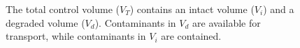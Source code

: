 \begin{figure}[h!]
  \begin{center}
    \def\svgwidth{.6\columnwidth}
    
  \end{center}
  \caption[Constituents of a Degradation Rate Control Volume]{The total control 
        volume ($V_T$) contains an
        intact volume ($V_i$) and a degraded volume ($V_d$). Contaminants in $V_d$ are
          available for transport, while contaminants in $V_i$ are contained.}
  \label{fig:deg_volumes}
\end{figure}

